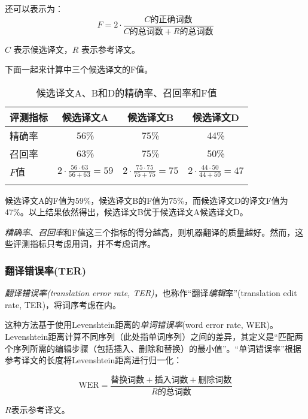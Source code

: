 \documentclass[output=paper]{langscibook}
\begin{document}
\noindent 还可以表示为：
\begin{equation}
F=2 \cdot \frac{C \text{的正确词数} }{C \text{的总词数}+ R \text{的总词数} }
\end{equation}

$C$ 表示候选译文，$R$ 表示参考译文。

下面一起来计算中三个候选译文的F值。



\begin{table}
\begin{tabular}{lccc}
\lsptoprule
{评测指标} & {候选译文A} & {候选译文B} & {候选译文D}\\
\midrule
精确率 & 56\% & 75\% & 44\%\\
召回率 & 63\% & 75\% & 50\%\\
$F$值 & $2{\cdot}\frac{56{\cdot}63}{56+63}=59$ & $2{\cdot}\frac{75{\cdot}75}{75+75}=75$ & $2{\cdot}\frac{44{\cdot}50}{44+50}=47$\\
\lspbottomrule
\end{tabular}
\caption{候选译文A、B和D的精确率、召回率和F值\label{tab:rossi:4}}
\end{table}


候选译文A的F值为59\%，候选译文B的F值为75\%，而候选译文D的译文F值为47\%。以上结果依然得出，候选译文B优于候选译文A候选译文D。

\textit{精确率}、\textit{召回率}和F值这三个指标的得分越高，则机器翻译的质量越好。然而，这些评测指标只考虑用词，并不考虑词序。


\subsubsection{翻译错误率(TER)}\largerpage

\textit{翻译错误率(translation error rate, TER)}，也称作“翻译\textit{编辑}率”(translation edit rate, TER)，将词序考虑在内。

这种方法基于使用Levenshtein距离的\textit{单词错误率}(word error rate, WER)。Levenshtein距离计算不同序列（此处指单词序列）之间的差异，其定义是“匹配两个序列所需的编辑步骤（包括插入、删除和替换）的最小值”\citep[224]{Koehn2010}。“单词错误率”根据参考译文的长度将Levenshtein距离进行归一化\citep[225]{Koehn2010}：


\begin{equation}
\text{WER}=
\frac{\text{替换词数}+\text{插入词数}+\text{删除词数}}
{R \text{的总词数} }
\end{equation}

\noindent $R$表示参考译文。
\end{document}
